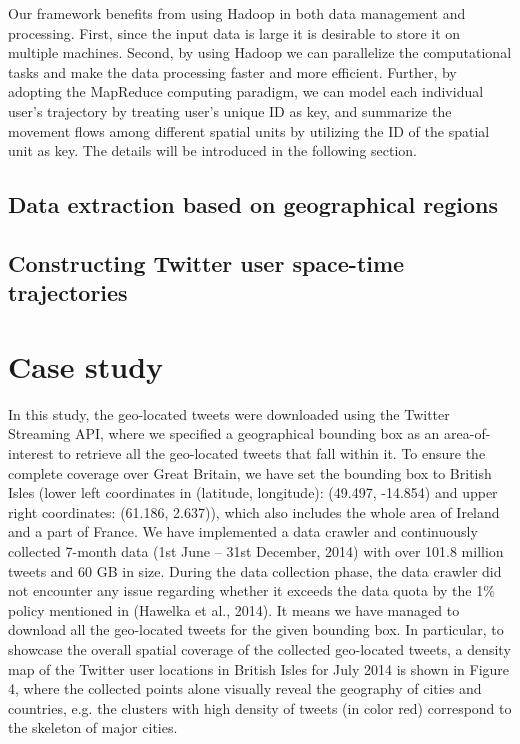\documentclass[a4paper,11pt]{article}
\begin{document}
Our framework benefits from using Hadoop in both data management and processing.
First, since the input data is large it is desirable to store it on multiple machines.
Second, by using Hadoop we can parallelize the computational tasks and make the data processing faster and more efficient.
Further, by adopting the MapReduce computing paradigm, we can model each individual user's trajectory by treating user's unique ID as key, and summarize the movement flows among different spatial units by utilizing the ID of the spatial unit as key. The details will be introduced in the following section.

\subsection{Data extraction based on geographical regions}


\subsection{Constructing Twitter user space-time trajectories}



\section{Case study}
In this study, the geo-located tweets were downloaded using the Twitter Streaming API, where we specified a geographical bounding box as an area-of-interest to retrieve all the geo-located tweets that fall within it.
To ensure the complete coverage over Great Britain, we have set the bounding box to British Isles (lower left coordinates in (latitude, longitude): (49.497, -14.854) and upper right coordinates: (61.186, 2.637)), which also includes the whole area of Ireland and a part of France.
We have implemented a data crawler and continuously collected 7-month data (1st June – 31st December, 2014) with over 101.8 million tweets and 60 GB in size.
During the data collection phase, the data crawler did not encounter any issue regarding whether it exceeds the data quota by the 1$\%$ policy mentioned in (Hawelka et al., 2014).
It means we have managed to download all the geo-located tweets for the given bounding box.
In particular, to showcase the overall spatial coverage of the collected geo-located tweets, a density map of the Twitter user locations in British Isles for July 2014 is shown in Figure 4, where the collected points alone visually reveal the geography of cities and countries, e.g. the clusters with high density of tweets (in color red) correspond to the skeleton of major cities.
\end{document}
